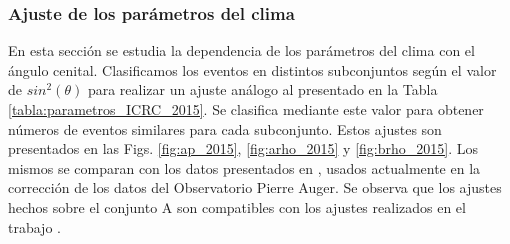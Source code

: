         \subsubsection{Ajuste de los parámetros del clima}
        En esta sección se estudia la dependencia de los parámetros del clima con el ángulo cenital. Clasificamos los eventos en distintos subconjuntos según el valor de $sin^2(\theta)$ para realizar un ajuste análogo al presentado en la Tabla \ref{tabla:parametros_ICRC_2015}. Se clasifica mediante este valor para obtener números de eventos similares para cada subconjunto. Estos ajustes son presentados en las Figs. \ref{fig:ap_2015}, \ref{fig:arho_2015} y \ref{fig:brho_2015}. Los mismos se comparan con los datos presentados en \cite{aab2017impact}, usados actualmente en la corrección de los datos del Observatorio Pierre Auger. Se observa que los ajustes hechos sobre el conjunto A son compatibles con los ajustes realizados en  el trabajo \cite{aab2017impact}. 
